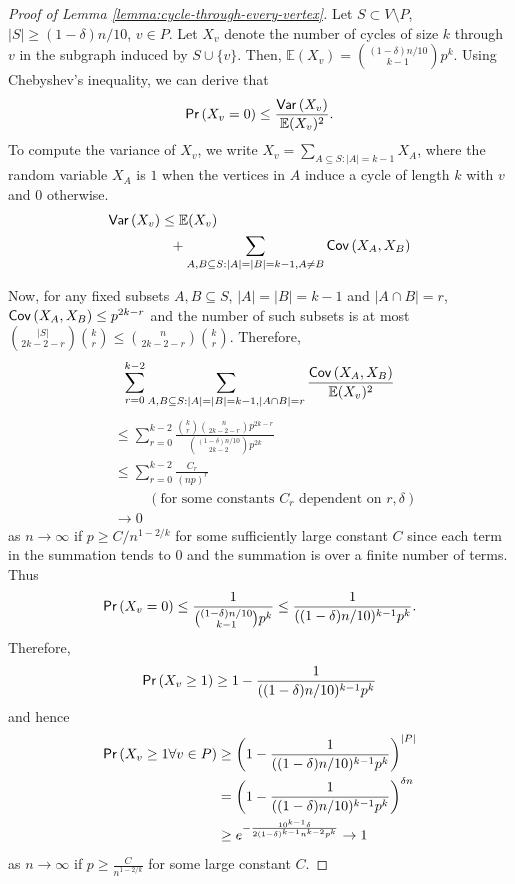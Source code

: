 \documentclass[11pt]{article}
\def\E{\mathbb{E}}
\newcommand{\prob}[1]{{\sf Pr}\left(#1\right)}
\newcommand{\var}[1]{{\sf Var}\left(#1\right)}
\newcommand{\cov}[1]{{\sf Cov}\left(#1\right)}
\begin{document}
\begin{proof}[Proof of Lemma \ref{lemma:cycle-through-every-vertex}]
Let $S\subset V\setminus P$, $|S|\geq (1-\delta)n/10$, $v\in P$. Let $X_v$ denote the number of cycles of size $k$ through $v$ in the subgraph induced by $S\cup\{v\}$. Then, $\E(X_v)=\binom{(1-\delta)n/10}{k-1}p^k$. Using Chebyshev's inequality, we can derive that
\[
\prob{X_v=0}\leq \frac{\var{X_v}}{\E(X_v)^2}.
\]
To compute the variance of $X_v$, we write $X_v=\sum_{A\subseteq S:|A|=k-1} X_{A}$, where the random variable $X_A$ is $1$ when the vertices in $A$ induce a cycle of length $k$ with $v$ and $0$ otherwise.
\begin{align*}
\var{X_v}&\leq \E(X_v)\\
&\ \ +\sum_{A,B\subseteq S:|A|=|B|=k-1,A\neq B} \cov{X_A,X_B}
\end{align*}

Now, for any fixed subsets $A,B\subseteq S$, $|A|=|B|=k-1$ and $|A\cap B|=r$, $\cov{X_A,X_B}\leq p^{2k-r}$ and the number of such subsets is at most $\binom{|S|}{2k-2-r}\binom{k}{r}\leq \binom{n}{2k-2-r}\binom{k}{r}$. Therefore,
\[
\sum_{r=0}^{k-2} \sum_{A,B\subseteq S:|A|=|B|=k-1,|A\cap B|=r} \frac{\cov{X_A,X_B}}{\E(X_v)^2}
\]
\begin{align*}
& \leq \sum_{r=0}^{k-2} \frac{\binom{k}{r}\binom{n}{2k-2-r}p^{2k-r}}{\binom{(1-\delta)n/10}{2k-2}p^{2k}}\\
& \leq \sum_{r=0}^{k-2}\frac{C_r}{(np)^{r}} \\
&\ \ \quad \quad (\text{for some constants $C_r$ dependent on $r,\delta$})\\
& \rightarrow 0
\end{align*}
as $n\rightarrow \infty$ if $p\geq C/n^{1-2/k}$ for some sufficiently large constant $C$ since each term in the summation tends to $0$ and the summation is over a finite number of terms. Thus
\[
\prob{X_v=0}\leq \frac{1}{\binom{(1-\delta)n/10}{k-1}p^k} \leq \frac{1}{((1-\delta)n/10)^{k-1}p^k} .
\]
Therefore,
\[
\prob{X_v\geq 1}\geq 1-\frac{1}{((1-\delta)n/10)^{k-1}p^k}
\]
and hence
\begin{align*}
\prob{X_v\geq 1 \forall v\in P} &\geq \left(1-\frac{1}{((1-\delta)n/10)^{k-1}p^k}\right)^{|P|}\\
&= \left(1-\frac{1}{((1-\delta)n/10)^{k-1}p^k}\right)^{\delta n}\\
&\geq e^{-\frac{10^{k-1}\delta}{2(1-\delta)^{k-1}n^{k-2}p^k}} \rightarrow 1
\end{align*}
as $n\rightarrow \infty$ if $p\geq \frac{C}{n^{1-2/k}}$ for some large constant $C$.
\end{proof}
\end{document}
